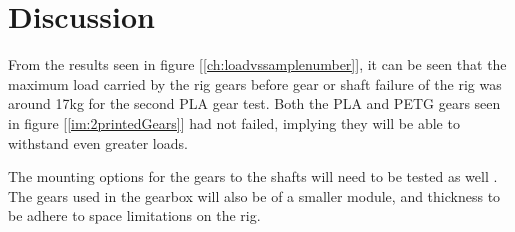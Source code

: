 \section{Discussion}
\label{sec:discussion}

\par
From the results seen in figure [\ref{ch:loadvssamplenumber}], it can be seen that the maximum load carried by the rig gears before gear or shaft failure of the rig was around 17kg for the second PLA gear test. Both the PLA and PETG gears seen in figure [\ref{im:2printedGears}] had not failed, implying they will be able to withstand even greater loads.

\par
The mounting options for the gears to the shafts will need to be tested as well \cite{youtube_LetsPrint} \cite{textbook_Shigley}. The gears used in the gearbox will also be of a smaller module, and thickness to be adhere to space limitations on the rig.